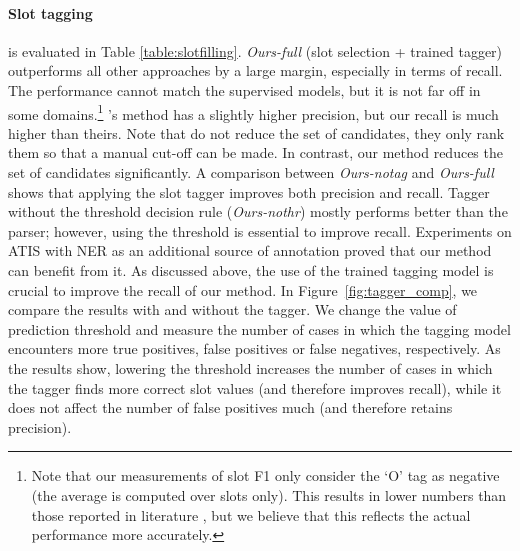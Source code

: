 \paragraph{Slot tagging}\hspace{-3mm} is evaluated in Table \ref{table:slotfilling}.
\emph{Ours-full} (slot selection + trained tagger) outperforms all other approaches by a large margin, especially in terms of recall.
The performance cannot match the supervised models, but it is not far off in some domains.\footnote{Note that our measurements of slot F1 only consider the `O' tag as negative (the average is computed over slots only). This results in lower numbers than those reported in literature \cite[cf.~e.g.][]{goo_slot-gated_2018}, but we believe that this reflects the actual performance more accurately.}
\citet{chen2014leveraging}'s method has a slightly higher precision, but our recall is much higher than theirs.
Note that \citet{chen2014leveraging} do not reduce the set of candidates, they only rank them so that a manual cut-off can be made.
In contrast, our method reduces the set of candidates significantly.
A comparison between \textit{Ours-notag} and \textit{Ours-full} shows that applying the slot tagger improves both precision and recall.
Tagger without the threshold decision rule (\textit{Ours-nothr}) mostly performs better than the parser; however, using the threshold is essential to improve recall.
Experiments on ATIS with NER as an additional source of annotation proved that our method can benefit from it.
As discussed above, the use of the trained tagging model is crucial to improve the recall of our method. In Figure~\ref{fig:tagger_comp}, we compare the results with and without the tagger. We change the value of prediction threshold and measure the number of cases in which the tagging model encounters more true positives, false positives or false negatives, respectively. As the results show, lowering the threshold increases the number of cases in which the tagger finds more correct slot values (and therefore improves recall), while it does not affect the number of false positives much (and therefore retains precision).
